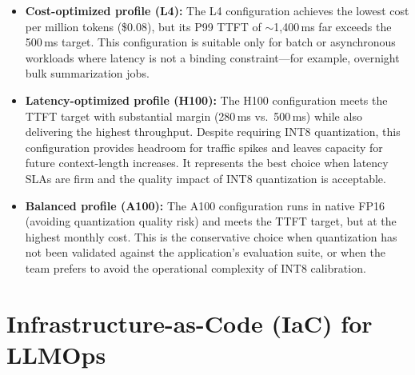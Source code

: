 \begin{itemize}
  \item \textbf{Cost-optimized profile (L4):} The L4 configuration achieves the lowest cost per million tokens (\$0.08), but its P99 TTFT of $\sim$1{,}400\,ms far exceeds the 500\,ms target. This configuration is suitable only for batch or asynchronous workloads where latency is not a binding constraint---for example, overnight bulk summarization jobs.

  \item \textbf{Latency-optimized profile (H100):} The H100 configuration meets the TTFT target with substantial margin (280\,ms vs.\ 500\,ms) while also delivering the highest throughput. Despite requiring INT8 quantization, this configuration provides headroom for traffic spikes and leaves capacity for future context-length increases. It represents the best choice when latency SLAs are firm and the quality impact of INT8 quantization is acceptable.

  \item \textbf{Balanced profile (A100):} The A100 configuration runs in native FP16 (avoiding quantization quality risk) and meets the TTFT target, but at the highest monthly cost. This is the conservative choice when quantization has not been validated against the application's evaluation suite, or when the team prefers to avoid the operational complexity of INT8 calibration.
\end{itemize}


\section{Infrastructure-as-Code (IaC) for LLMOps}
\label{sec:iac}

